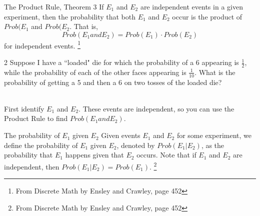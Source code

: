 \documentclass[a4paper,12pt]{book}
\newcounter{question}
\begin{document}
        
        \newpage{}
        \begin{intro}{The Product Rule, Theorem 3}
            If $E_{1}$ and $E_{2}$ are independent events in a given
            experiment, then the probability that both $E_{1}$ and $E_{2}$
            occur is the product of $Prob(E_{1}$ and $Prob(E_{2}$. That is,
            $$ Prob(E_{1} and E_{2}) = Prob(E_{1}) \cdot Prob(E_{2}) $$
            for independent events.
            \footnote{From Discrete Math by Ensley and Crawley, page 452}
        \end{intro}

        
        \begin{question}{\thequestion}{2}
            Suppose I have a ``loaded" die for which the probability of a 6
            appearing is $\frac{1}{2}$, while the probability of each of the other faces
            appearing is $\frac{1}{10}$. What is the probability of getting a 5
            and then a 6 on two tosses of the loaded die?

            ~\\
            First identify $E_{1}$ and $E_{2}$. These events are independent,
            so you can use the Product Rule to find $Prob(E_{1} and E_{2})$.

        \end{question}
        
        \begin{intro}{The probability of $E_{1}$ given $E_{2}$}
            Given events $E_{1}$ and $E_{2}$ for some experiment, we
            define the probability of $E_{1}$ given $E_{2}$, denoted by
            $Prob(E_{1} | E_{2})$, as the probability that $E_{1}$ happens
            given that $E_{2}$ occurs. Note that if $E_{1}$ and $E_{2}$
            are independent, then $Prob( E_{1} | E_{2}) = Prob(E_{1})$.
            \footnote{From Discrete Math by Ensley and Crawley, page 452}
        \end{intro}
        
\end{document}

